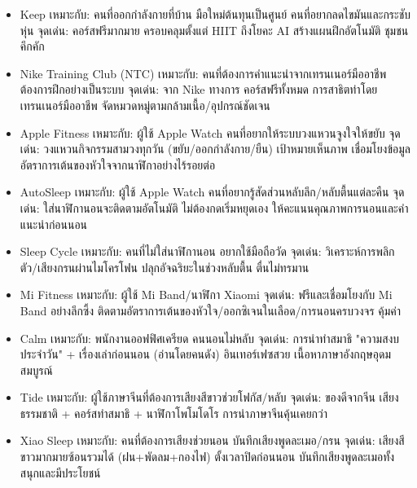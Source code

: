 
\begin{itemize}
  \item Keep เหมาะกับ: คนที่ออกกำลังกายที่บ้าน มือใหม่ต้นทุนเป็นศูนย์ คนที่อยากลดไขมันและกระชับหุ่น จุดเด่น: คอร์สฟรีมากมาย ครอบคลุมตั้งแต่ HIIT ถึงโยคะ AI สร้างแผนฝึกอัตโนมัติ ชุมชนคึกคัก
  \item Nike Training Club (NTC) เหมาะกับ: คนที่ต้องการคำแนะนำจากเทรนเนอร์มืออาชีพ ต้องการฝึกอย่างเป็นระบบ จุดเด่น: จาก Nike ทางการ คอร์สฟรีทั้งหมด การสาธิตท่าโดยเทรนเนอร์มืออาชีพ จัดหมวดหมู่ตามกล้ามเนื้อ/อุปกรณ์ชัดเจน
  \item Apple Fitness เหมาะกับ: ผู้ใช้ Apple Watch คนที่อยากให้ระบบวงแหวนจูงใจให้ขยับ จุดเด่น: วงแหวนกิจกรรมสามวงทุกวัน (ขยับ/ออกกำลังกาย/ยืน) เป้าหมายเห็นภาพ เชื่อมโยงข้อมูลอัตราการเต้นของหัวใจจากนาฬิกาอย่างไร้รอยต่อ
\end{itemize}


\begin{itemize}
  \item AutoSleep เหมาะกับ: ผู้ใช้ Apple Watch คนที่อยากรู้สัดส่วนหลับลึก/หลับตื้นแต่ละคืน จุดเด่น: ใส่นาฬิกานอนจะติดตามอัตโนมัติ ไม่ต้องกดเริ่มหยุดเอง ให้คะแนนคุณภาพการนอนและคำแนะนำก่อนนอน
  \item Sleep Cycle เหมาะกับ: คนที่ไม่ใส่นาฬิกานอน อยากใช้มือถือวัด จุดเด่น: วิเคราะห์การพลิกตัว/เสียงกรนผ่านไมโครโฟน ปลุกอัจฉริยะในช่วงหลับตื้น ตื่นไม่ทรมาน
  \item Mi Fitness เหมาะกับ: ผู้ใช้ Mi Band/นาฬิกา Xiaomi จุดเด่น: ฟรีและเชื่อมโยงกับ Mi Band อย่างลึกซึ้ง ติดตามอัตราการเต้นของหัวใจ/ออกซิเจนในเลือด/การนอนครบวงจร คุ้มค่า
\end{itemize}


\begin{itemize}
  \item Calm เหมาะกับ: พนักงานออฟฟิศเครียด คนนอนไม่หลับ จุดเด่น: การนำทำสมาธิ "ความสงบประจำวัน" + เรื่องเล่าก่อนนอน (อ่านโดยคนดัง) อินเทอร์เฟซสวย เนื้อหาภาษาอังกฤษอุดมสมบูรณ์
  \item Tide เหมาะกับ: ผู้ใช้ภาษาจีนที่ต้องการเสียงสีขาวช่วยโฟกัส/หลับ จุดเด่น: ของดีจากจีน เสียงธรรมชาติ + คอร์สทำสมาธิ + นาฬิกาโพโมโดโร การนำภาษาจีนคุ้นเคยกว่า
  \item Xiao Sleep เหมาะกับ: คนที่ต้องการเสียงช่วยนอน บันทึกเสียงพูดละเมอ/กรน จุดเด่น: เสียงสีขาวมากมายซ้อนรวมได้ (ฝน+พัดลม+กองไฟ) ตั้งเวลาปิดก่อนนอน บันทึกเสียงพูดละเมอทั้งสนุกและมีประโยชน์
\end{itemize}

